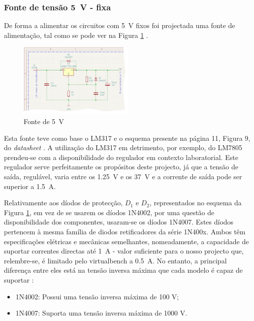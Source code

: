 \subsubsection{Fonte de tensão \SI{5}{\volt} - fixa}
De forma a alimentar os circuitos com \SI{5}{\volt} fixos foi projectada uma fonte de alimentação, tal como se pode ver na Figura \ref{fig:fonte5V} \cite{LM317}.

\begin{figure}[hbtp]
	\centering
	\includegraphics[width=0.5\textwidth]{figures/sch_fonte5V.png}
	\caption{Fonte de \SI{5}{\volt}}
	\label{fig:fonte5V}
\end{figure}

Esta fonte teve como base o LM317 e o esquema presente na página 11, Figura 9, do \textit{datasheet} \cite{LM317}. A utilização do LM317 em detrimento, por exemplo, do LM7805 prendeu-se com a disponibilidade do regulador em contexto laboratorial. Este regulador serve perfeitamente os propósitos deste projecto, já que a tensão de saída, regulável, varia entre os \SI{1.25}{\volt} e os \SI{37}{\volt} e a corrente de saída pode ser superior a \SI{1.5}{\ampere}.

Relativamente aos díodos de protecção, $D_{1}$ e $D_{2}$, representados no esquema da Figura \ref{fig:fonte5V}, em vez de se usarem os díodos 1N4002, por uma questão de disponibilidade dos componentes, usaram-se os díodos 1N4007. Estes díodos pertencem à mesma família de diodos retificadores da série 1N400x. Ambos têm especificações elétricas e mecânicas semelhantes, nomeadamente, a capacidade de suportar correntes directas até \SI{1}{\ampere} - valor suficiente para o nosso projecto que, relembre-se, é limitado pelo \acrshort{virtualbench} a \SI{0.5}{\ampere}. No entanto, a principal diferença entre eles está na tensão inversa máxima que cada modelo é capaz de suportar \cite{1N400x}:

\begin{itemize}
	\item 1N4002: Possui uma tensão inversa máxima de 100 V;
	\item 1N4007: Suporta uma tensão inversa máxima de 1000 V.
\end{itemize}

